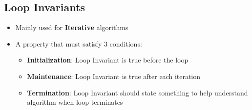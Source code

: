 \documentclass[10pt, 
a4paper, 
oneside, 
headinclude, footinclude, 
BCOR5mm]
{scrartcl}
\begin{document}
\subsection{Loop Invariants}
\begin{itemize}
    \item Mainly used for \textbf{Iterative} algorithms
    \item A property that must satisfy 3 conditions:
    \begin{itemize}
        \item \textbf{Initialization}: Loop Invariant is true before the loop
        \item \textbf{Maintenance}: Loop Invariant is true after each iteration
        \item \textbf{Termination}: Loop Invariant should state something to help understand algorithm when loop terminates
    \end{itemize}
\end{itemize}
\end{document}
